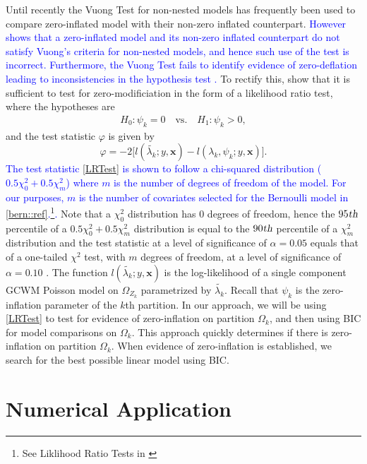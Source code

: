 \documentclass[11pt,letterpaper]{article}
\numberwithin{equation}{section}
\numberwithin{equation}{section}
\numberwithin{equation}{section}
\begin{document}
Until recently the Vuong Test for non-nested models  \citep{vuongTest} has frequently been used to compare zero-inflated model with their non-zero inflated counterpart. \textcolor{blue}{However \cite{misuse} shows that a zero-inflated model and its non-zero inflated counterpart do not satisfy Vuong's criteria for non-nested models, and hence such use of the test is incorrect. Furthermore, the Vuong Test fails to identify evidence of zero-deflation leading to inconsistencies in the hypothesis test \citep[see][]{misuse}.} To rectify this, \cite{newIntuitive} show that it is sufficient to test for zero-modificiation in the form of a likelihood ratio test, where the hypotheses are
\begin{align*}
& & H_0: \psi_k = 0 \quad \text{vs.} \quad H_1: \psi_k > 0, & &
\end{align*}
and the test statistic $\varphi$ is given by
\begin{equation}
\varphi = -2 \big[l(\tilde{\lambda_k}; y, \bm{x}) - l(\lambda_k, \psi_k; y , \bm{x} )\big].
\label{LRTest}
\end{equation}
\textcolor{blue}{The test statistic \eqref{LRTest} is shown to follow a chi-squared distribution ($0.5\chi^2_0+0.5\chi^2_{m}$) where $m$ is the  number of degrees of freedom of the model. For our purposes, $m$ is the number of covariates selected for the Bernoulli model in \eqref{bern::ref}.\footnote{See Liklihood Ratio Tests in  \cite{newIntuitive}}. } Note that  a $\chi^2_0$ distribution has 0 degrees of freedom, hence the $95{\mbox{\sl{th}}}$ percentile of a  $0.5\chi^2_0+0.5\chi^2_{m}$ distribution is equal to the $90{\mbox{\sl{th}}}$ percentile of a $\chi^2_{m}$ distribution and the test statistic at a level of significance of $\alpha=0.05$ equals that of a one-tailed $\chi^2$ test, with $m$ degrees of freedom, at a level of significance of $\alpha=0.10$ \citep[see][]{newIntuitive}. The function 
$l(\tilde{\lambda_k}; y , \bm{x})$ is the log-likelihood of a single component GCWM Poisson model on $\Omega_{Z_k}$ parametrized by $\tilde{\lambda_k}$. Recall that $\psi_k$ is the zero-inflation parameter of the $k$th partition.  In our approach, we will be using \eqref{LRTest} to  test for evidence of zero-inflation on partition $\Omega_k$, and then using BIC for model comparisons on $\Omega_k$. This approach quickly determines if there is zero-inflation on partition $\Omega_k$.  When evidence of zero-inflation is established, we search for the best possible linear model using BIC. 

\section{Numerical Application}\label{sec:numapp}
\end{document}
